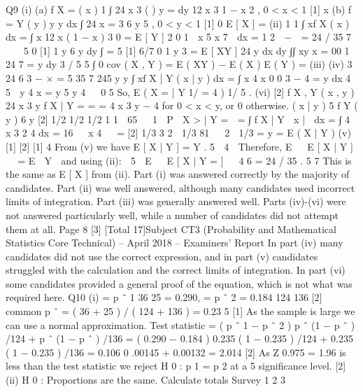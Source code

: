 \documentclass[a4paper,12pt]{article}
\begin{document}
\begin{enumerate}
Q9
(i)
(a)
f X =
( x )
1
∫ 24 x
3
(
)
y =
dy 12 x 3 1 − x 2 ,      0 < x < 1
[1]
x
(b)
f =
Y ( y )
y
y dx
∫ 24 x =
3
6 y 5 ,     0 < y < 1
[1]
0
E [ X ] =
(ii)
1
1
∫ xf X ( x ) dx = ∫ x 12 x ( 1 − x )
3
0
=
E [ Y ]
2
0
1
 x 5 x 7 
dx =
  1
2  −  = 24 / 35    
7  
  5
0
[1]
1
y 6  
y dy
∫ =
5
[1]
6/7
0
1 y
3
=
E [ XY ]   24
y   
dx dy
∫∫ xy x =
00
1
24 7
=
y dy 3 / 5
5 ∫
0
cov ( X , Y ) = E ( XY ) − E ( X ) E ( Y ) =
(iii)
(iv)
3 24 6
3
− × =
5 35 7 245
y
y
∫ xf X | Y ( x | y ) dx = ∫ x 4 x
0
0
3 − 4
=
y dx
4  5  y 4
x =
y
5 y 4   0 5
So, E ( X
=
| Y 1/ =
4 ) 1/ 5 .
(vi)
[2]
f X , Y ( x , y ) 24 x 3 y
f X | Y =
= =
4 x 3 y − 4 for 0 < x < y, or 0 otherwise.
( x | y )   
5
f Y ( y )
6 y
[2]
1/2
1/2
1/2
1
1 
65

 1 
P  X > | Y =  = ∫ f X | Y  x |  dx = ∫ 4 x 3 2 4 dx = 16   x 4   =
[2]
1/3
3
2  1/3
81

 2 
1/3
= y =
E ( X | Y
)
(v)
[1]
[2]
[1]
4
From (v) we have E [ X | Y ] =    Y .
5
 4 
Therefore, E   E [ X | Y ]   = E  Y  and using (ii):
 5 
E   E [ X | Y =
]  
4 6
= 24 / 35 .
5 7
This is the same as E [ X ] from (ii).
Part (i) was answered correctly by the majority of candidates. Part (ii)
was well answered, although many candidates used incorrect limits of
integration. Part (iii) was generally answered well. Parts (iv)-(vi) were
not answered particularly well, while a number of candidates did not
attempt them at all.
Page 8
[3]
[Total 17]Subject CT3 (Probability and Mathematical Statistics Core Technical) – April 2018 – Examiners’ Report
In part (iv) many candidates did not use the correct expression, and in
part (v) candidates struggled with the calculation and the correct limits
of integration. In part (vi) some candidates provided a general proof of
the equation, which is not what was required here.
Q10
(i)
=
p ˆ 1
36
25
= 0.290, =
p ˆ 2 = 0.184
124
136
[2]
common p ˆ = ( 36 + 25 ) / ( 124 + 136 ) = 0.23 5
[1]
As the sample is large we can use a normal approximation.
Test statistic =
( p ˆ 1 − p ˆ 2 )
p ˆ (1 − p ˆ ) /124 + p ˆ (1 − p ˆ ) /136
= ( 0.290 − 0.184 )
0.235 ( 1 − 0.235 ) /124 + 0.235 ( 1 − 0.235 ) /136
= 0.106
0 .00145 + 0.00132
= 2.014
[2]
As Z 0.975 = 1.96 is less than the test statistic we reject H 0 : p 1 = p 2 at a 5%
significance level.
[2]
(ii)
H 0 : Proportions are the same.
Calculate totals
Survey 1 2 3

\end{enumerate}
\end{document}
